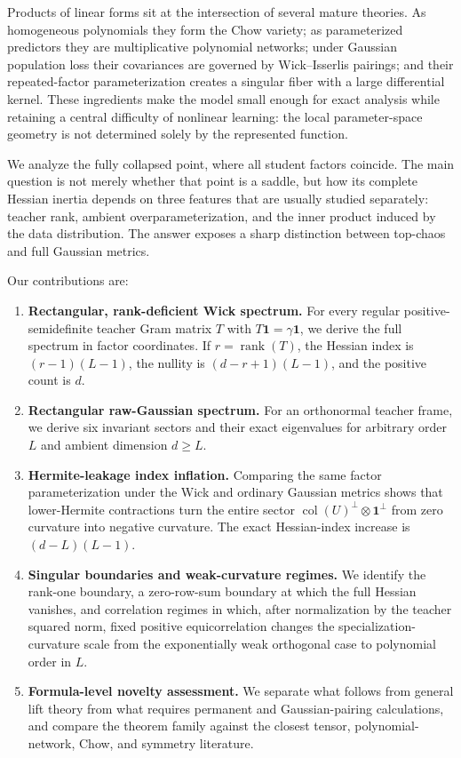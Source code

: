 \documentclass[11pt]{article}
\newcommand{\one}{\mathbf{1}}
\newcommand{\rank}{\operatorname{rank}}
\newcommand{\col}{\operatorname{col}}
\begin{document}
Products of linear forms sit at the intersection of several mature theories.  As homogeneous polynomials they form the Chow variety; as parameterized predictors they are multiplicative polynomial networks; under Gaussian population loss their covariances are governed by Wick--Isserlis pairings; and their repeated-factor parameterization creates a singular fiber with a large differential kernel.  These ingredients make the model small enough for exact analysis while retaining a central difficulty of nonlinear learning: the local parameter-space geometry is not determined solely by the represented function.

We analyze the fully collapsed point, where all student factors coincide.  The main question is not merely whether that point is a saddle, but how its complete Hessian inertia depends on three features that are usually studied separately: teacher rank, ambient overparameterization, and the inner product induced by the data distribution.  The answer exposes a sharp distinction between top-chaos and full Gaussian metrics.

Our contributions are:
\begin{enumerate}[label=(\roman*)]
\item \textbf{Rectangular, rank-deficient Wick spectrum.}  For every regular positive-semidefinite teacher Gram matrix $T$ with $T\one=\gamma\one$, we derive the full spectrum in factor coordinates.  If $r=\rank(T)$, the Hessian index is $(r-1)(L-1)$, the nullity is $(d-r+1)(L-1)$, and the positive count is $d$.
\item \textbf{Rectangular raw-Gaussian spectrum.}  For an orthonormal teacher frame, we derive six invariant sectors and their exact eigenvalues for arbitrary order $L$ and ambient dimension $d\ge L$.
\item \textbf{Hermite-leakage index inflation.}  Comparing the same factor parameterization under the Wick and ordinary Gaussian metrics shows that lower-Hermite contractions turn the entire sector $\col(U)^\perp\otimes\one^\perp$ from zero curvature into negative curvature.  The exact Hessian-index increase is $(d-L)(L-1)$.
\item \textbf{Singular boundaries and weak-curvature regimes.}  We identify the rank-one boundary, a zero-row-sum boundary at which the full Hessian vanishes, and correlation regimes in which, after normalization by the teacher squared norm, fixed positive equicorrelation changes the specialization-curvature scale from the exponentially weak orthogonal case to polynomial order in $L$.
\item \textbf{Formula-level novelty assessment.}  We separate what follows from general lift theory from what requires permanent and Gaussian-pairing calculations, and compare the theorem family against the closest tensor, polynomial-network, Chow, and symmetry literature.
\end{enumerate}
\end{document}
